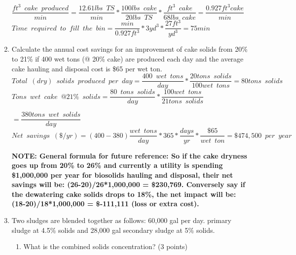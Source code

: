 \documentclass{article}
\begin{document}
\begin{enumerate}
$\dfrac{ft^3 \enspace cake \enspace produced}{min}=\dfrac{12.61lbs \enspace TS}{min}*\dfrac{100 lbs \enspace cake}{20lbs \enspace TS}*\dfrac{ft^3 \enspace cake}{68 lbs \enspace cake} = \dfrac{0.927ft^3 cake}{min}$\\
\vspace{3mm}
$Time \enspace required \enspace to \enspace fill \enspace the \enspace bin=\dfrac{min}{0.927ft^3}*{3yd^3}*\dfrac{27ft^3}{yd^3}=\boxed{75min}$\\
\pagebreak
\item Calculate the annual cost savings for an improvement of cake solids from 20\% to 21\% if 400 wet tons (@ 20\% cake) are produced each day and the average cake hauling and disposal cost is \$65 per wet ton.\\
$Total \enspace (dry)\enspace solids \enspace produced \enspace per \enspace day =\dfrac{400 \enspace wet \enspace tons}{day}*\dfrac{20 tons \enspace solids}{100 wet \enspace tons}={80 tons \enspace solids}$\\
\vspace{3mm}
$Tons \enspace wet \enspace cake \enspace@ 21\% \enspace solids =\dfrac{80 \enspace tons \enspace solids}{day}*\dfrac{100 wet \enspace tons}{21 tons \enspace solids}$

\vspace{3mm}
$=\dfrac{380 tons \enspace  wet \enspace solids}{day}$\\
\vspace{3mm}
$Net \enspace savings \enspace (\$/yr) = (400 - 380)\dfrac{wet \enspace tons}{day}*365*\dfrac{days}{yr}*\dfrac{\$65}{wet \enspace ton}=\boxed{\$474,500 \enspace per \enspace year}$


\textbf {NOTE:  General formula for future reference: So if the cake dryness goes up from 20\% to 26\% and currently a utility is spending \$1,000,000 per year for biosolids hauling and disposal, their net savings will be: (26-20)/26*1,000,000 = \$230,769.  Conversely say if the dewatering cake solids drops to 18\%, the net impact will be: (18-20)/18*1,000,000 = \$-111,111 (loss or extra cost).}
\\

\item Two sludges are blended together as follows: 60,000 gal per day. primary sludge at 4.5\% solids and 28,000 gal secondary sludge at 5\% solids. 
\begin{enumerate}
\item What is the combined solids concentration?  (3 points)\\


\end{enumerate}
\end{enumerate}
\end{document}
